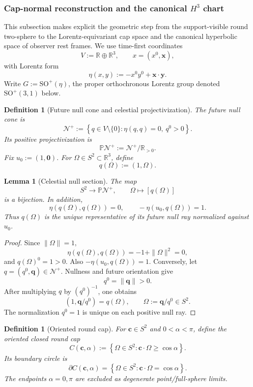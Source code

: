 \documentclass[11pt]{article}
\newtheorem{lemma}[theorem]{Lemma}
\newtheorem{definition}[theorem]{Definition}
\begin{document}
\subsubsection{Cap-normal reconstruction and the canonical \(H^3\) chart}
\label{sec:cap-normal-h3}

This subsection makes explicit the geometric step from the support-visible round
two-sphere to the Lorentz-equivariant cap space and the canonical hyperbolic
space of observer rest frames. We use time-first coordinates
\[
V:=\mathbb R\oplus\mathbb R^3,\qquad x=(x^0,\mathbf x),
\]
with Lorentz form
\[
\eta(x,y):=-x^0y^0+\mathbf x\cdot\mathbf y.
\]
Write \(G:=\mathrm{SO}^{+}(\eta)\), the proper orthochronous Lorentz group
denoted \(\mathrm{SO}^{+}(3,1)\) below.

\begin{definition}[Future null cone and celestial projectivization]
\label{def:celestial-null-cone}
The future null cone is
\[
\mathcal N^{+}:=
\left\{q\in V\setminus\{0\}:\eta(q,q)=0,\ q^0>0\right\}.
\]
Its positive projectivization is
\[
\mathbb P\mathcal N^{+}:=\mathcal N^{+}/\mathbb R_{>0}.
\]
Fix \(u_0:=(1,\mathbf0)\). For \(\Omega\in S^2\subset\mathbb R^3\), define
\[
q(\Omega):=(1,\Omega).
\]
\end{definition}

\begin{lemma}[Celestial null section]\label{lem:celestial-null-section}
The map
\[
S^2\longrightarrow\mathbb P\mathcal N^{+},\qquad
\Omega\longmapsto[q(\Omega)]
\]
is a bijection. In addition,
\[
\eta(q(\Omega),q(\Omega))=0,\qquad -\eta(u_0,q(\Omega))=1.
\]
Thus \(q(\Omega)\) is the unique representative of its future null ray
normalized against \(u_0\).
\end{lemma}

\begin{proof}
Since \(\|\Omega\|=1\),
\[
\eta(q(\Omega),q(\Omega))=-1+\|\Omega\|^2=0,
\]
and \(q(\Omega)^0=1>0\). Also \(-\eta(u_0,q(\Omega))=1\). Conversely, let
\(q=(q^0,\mathbf q)\in\mathcal N^+\). Nullness and future orientation give
\[
q^0=\|\mathbf q\|>0.
\]
After multiplying \(q\) by \((q^0)^{-1}\), one obtains
\[
(1,\mathbf q/q^0)=q(\Omega),\qquad \Omega:=\mathbf q/q^0\in S^2.
\]
The normalization \(q^0=1\) is unique on each positive null ray.
\end{proof}

\begin{definition}[Oriented round cap]\label{def:oriented-round-cap}
For \(\mathbf c\in S^2\) and \(0<\alpha<\pi\), define the oriented closed
round cap
\[
C(\mathbf c,\alpha):=
\left\{\Omega\in S^2:\mathbf c\cdot\Omega\geq\cos\alpha\right\}.
\]
Its boundary circle is
\[
\partial C(\mathbf c,\alpha)=
\left\{\Omega\in S^2:\mathbf c\cdot\Omega=\cos\alpha\right\}.
\]
The endpoints \(\alpha=0,\pi\) are excluded as degenerate point/full-sphere
limits.
\end{definition}
\end{document}
